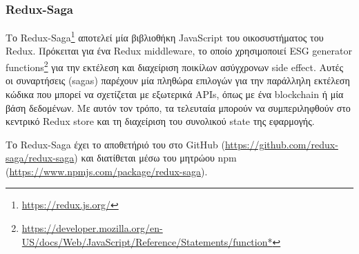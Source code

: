 \subsubsection{Redux-Saga} \label{subsection:4-2-2-3-redux-saga}


Το Redux-Saga\footnote{\url{https://redux.js.org/}} αποτελεί μία βιβλιοθήκη JavaScript του οικοσυστήματος του Redux. Πρόκειται για ένα Redux middleware, το οποίο χρησιμοποιεί ESG generator functions\footnote{\url{https://developer.mozilla.org/en-US/docs/Web/JavaScript/Reference/Statements/function*}} για την εκτέλεση και διαχείριση ποικίλων ασύγχρονων side effect. Αυτές οι συναρτήσεις (sagas) παρέχουν μία πληθώρα επιλογών για την παράλληλη εκτέλεση κώδικα που μπορεί να σχετίζεται με εξωτερικά APIs, όπως με ένα blockchain ή μία βάση δεδομένων. Με αυτόν τον τρόπο, τα τελευταία μπορούν να συμπεριληφθούν στο κεντρικό Redux store και τη διαχείριση του συνολικού state της εφαρμογής.

Το Redux-Saga έχει το αποθετήριό του στο GitHub (\url{https://github.com/redux-saga/redux-saga}) και διατίθεται μέσω του μητρώου npm (\url{https://www.npmjs.com/package/redux-saga}).
